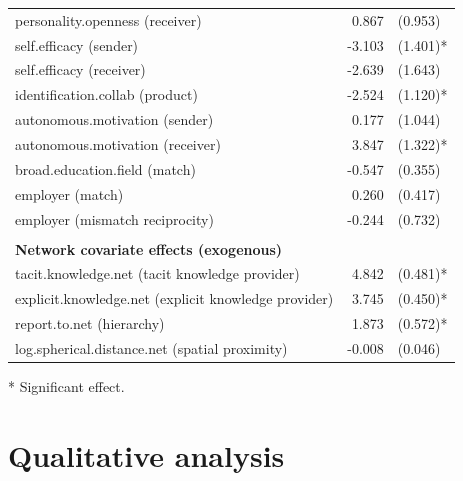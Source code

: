 \begin{table}[]
\begin{threeparttable}
\begin{tabular}{@{}lrl@{}}
			personality.openness (receiver)                      & 0.867          & (0.953)          \\
			self.efficacy (sender)                               & -3.103         & (1.401)*         \\
			self.efficacy (receiver)                             & -2.639         & (1.643)          \\
			identification.collab (product)                      & -2.524         & (1.120)*          \\
			autonomous.motivation (sender)                       & 0.177          & (1.044)          \\
			autonomous.motivation (receiver)                     & 3.847          & (1.322)*         \\
			broad.education.field (match)                        & -0.547         & (0.355)          \\
			employer (match)                                     & 0.260          & (0.417)          \\
			employer (mismatch reciprocity)                      & -0.244         & (0.732)          \\
			&                &                  \\
			\textbf{Network covariate effects (exogenous)}       &                &                  \\
			tacit.knowledge.net (tacit knowledge provider)       & 4.842          & (0.481)*         \\
			explicit.knowledge.net (explicit knowledge provider) & 3.745          & (0.450)*          \\
			report.to.net (hierarchy)                            & 1.873          & (0.572)*         \\
			log.spherical.distance.net (spatial proximity)       & -0.008         & (0.046)          \\ \bottomrule
			\end{tabular}
			\begin{tablenotes}
				\small
				\item [*] Significant effect.
			\end{tablenotes}
	\end{threeparttable}
\end{table}

\section{Qualitative analysis}

